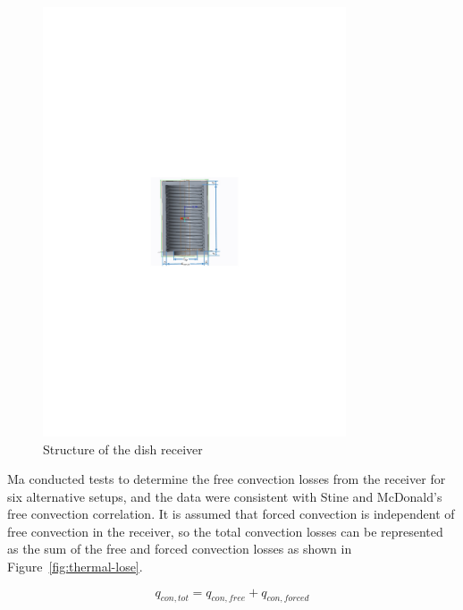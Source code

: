 \documentclass{article}
\begin{document}
\noindent \begin{figure}[htbp]
\begin{center}
	\includegraphics[width = 0.8\textwidth]{graphics/dishReceiver}
	\caption{Structure of the dish receiver}
	\label{fig:dishReceiver}
\end{center}
\end{figure}
Ma conducted tests to determine the free convection losses from the receiver for six alternative setups, and the data were consistent with Stine and McDonald's free convection correlation\cite{Ma1993}. It is assumed that forced convection is independent of free convection in the receiver, so the total convection losses can be represented as the sum of the free and forced convection losses as shown in Figure~\ref{fig:thermal-lose}.

\begin{equation}
	q_{con,tot} = q_{con,free} + q_{con,forced}
\end{equation}
\end{document}
